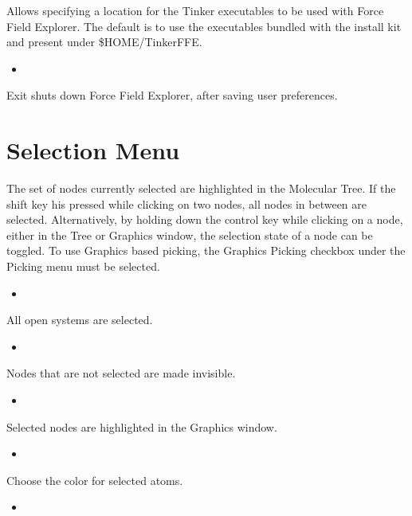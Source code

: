 \documentclass[letterpaper,11pt,english]{sphinxmanual}
\begin{document}
Allows specifying a location for the Tinker executables to be used with Force Field Explorer. The default is to use the executables bundled with the install kit and present under \$HOME/Tinker\sphinxhyphen{}FFE.
\begin{itemize}
\item {} 

\end{itemize}

Exit shuts down Force Field Explorer, after saving user preferences.


\section{Selection Menu}
\label{\detokenize{text/menus:selection-menu}}
The set of nodes currently selected are highlighted in the Molecular Tree. If the shift key his pressed while clicking on two nodes, all nodes in between are selected. Alternatively, by holding down the control key while clicking on a node, either in the Tree or Graphics window, the selection state of a node can be toggled. To use Graphics based picking, the Graphics Picking checkbox under the Picking menu must be selected.
\begin{itemize}
\item {} 

\end{itemize}

All open systems are selected.
\begin{itemize}
\item {} 

\end{itemize}

Nodes that are not selected are made invisible.
\begin{itemize}
\item {} 

\end{itemize}

Selected nodes are highlighted in the Graphics window.
\begin{itemize}
\item {} 

\end{itemize}

Choose the color for selected atoms.
\begin{itemize}
\item {} 

\end{itemize}
\end{document}
